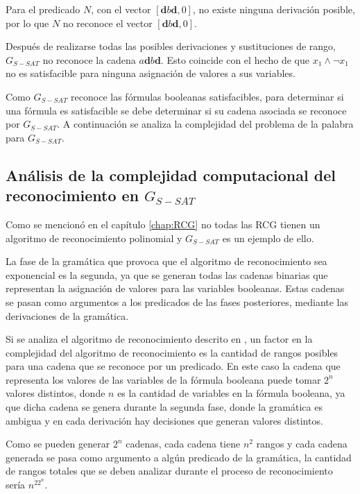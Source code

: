 \documentclass[12pt]{article}
\begin{document}
Para el predicado $N$, con el vector $[\mathbf{d}b\mathbf{d},0]$, no existe ninguna derivación posible, por lo que 
$N$ no reconoce el vector $[\mathbf{d}b\mathbf{d},0]$.

Después de realizarse todas las posibles derivaciones y sustituciones de rango, $G_{S-SAT}$ no reconoce la cadena
$a\mathbf{d}b\mathbf{d}$. Esto coincide con el hecho de que $x_1 \wedge \neg x_1$ no es satisfacible para ninguna asignación de valores a sus variables.


Como $G_{S-SAT}$ reconoce las fórmulas booleanas satisfacibles, para determinar si una fórmula es satisfacible se debe determinar si su cadena asociada se reconoce por $G_{S-SAT}$. A continuación se analiza la complejidad del problema de la palabra para $G_{S-SAT}$.

\subsection{Análisis de la complejidad computacional del reconocimiento en $G_{S-SAT}$}

Como se mencionó en el capítulo \ref{chap:RCG} no todas las RCG tienen un algoritmo de reconocimiento polinomial 
y $G_{S-SAT}$ es un ejemplo de ello.

La fase de la gramática que provoca que el algoritmo de reconocimiento sea exponencial es la segunda, ya que  se generan 
todas las cadenas binarias que representan la asignación de valores para las variables booleanas.
Estas cadenas se pasan como argumentos a los predicados de las fases posteriores, mediante las derivaciones de la gramática.

Si se analiza el algoritmo de reconocimiento descrito en \cite{mainRCGBib}, un factor en la complejidad del 
algoritmo de reconocimiento es la cantidad de rangos posibles para una cadena que se reconoce por un predicado. 
En este caso la cadena que representa los valores de las variables de la fórmula booleana puede tomar $2^n$
valores distintos, donde $n$ es la cantidad de variables en la fórmula booleana, ya que dicha cadena se genera 
durante la segunda fase, donde la gramática es ambigua y en cada derivación hay decisiones que generan valores 
distintos.

Como se pueden generar $2^n$ cadenas, cada cadena tiene $n^2$ rangos y cada cadena generada se pasa como 
argumento a algún predicado de la gramática, la cantidad de rangos totales que se deben analizar durante 
el proceso de reconocimiento sería $n^22^n$.
\end{document}
